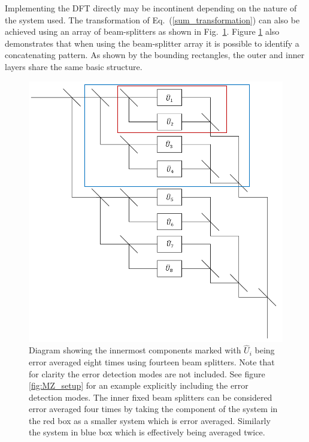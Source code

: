 \documentclass[aps,pra,twocolumn,superscriptaddress,numerical]{revtex4-1}
\begin{document}
Implementing the DFT directly may be incontinent depending on the nature of the system used.  The transformation of Eq.~(\ref{sum_transformation}) can also be achieved using an array of beam-splitters as shown in Fig.~\ref{fig:gen system}. 
Figure \ref{fig:gen system} also demonstrates that when using the beam-splitter array it is possible to identify a concatenating pattern.  As shown by the bounding rectangles, the outer and inner layers share the same basic structure. 
%
\begin{figure}
	\includegraphics[width=\columnwidth]{unitaries.PNG}
	\caption{\label{fig:gen system}Diagram showing the innermost components marked with $\hat{U}_i$ being error averaged eight times using fourteen beam splitters. Note that for clarity the error detection modes are not included. See figure \ref{fig:MZ_setup} for an example explicitly including the error detection modes. The inner fixed beam splitters can be considered error averaged four times by taking the component of the system in the red box as a smaller system which is error averaged. Similarly the system in blue box which is effectively being averaged twice.}
\end{figure}
\end{document}
